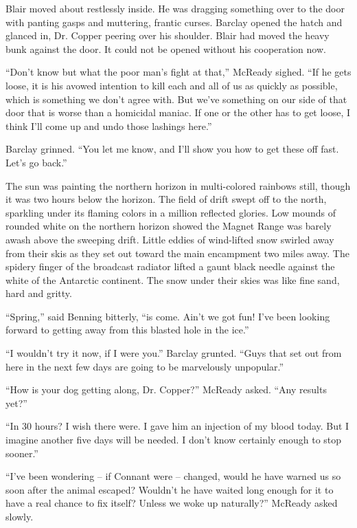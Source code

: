 \documentclass[letterpaper,openany,12pt]{memoir}		%
\begin{document}
Blair moved about restlessly inside. He was dragging something over to the door
with panting gasps and muttering, frantic curses. Barclay opened the hatch and
glanced in, Dr. Copper peering over his shoulder. Blair had moved the heavy bunk
against the door. It could not be opened without his cooperation now.

``Don't know but what the poor man's fight at that,'' McReady sighed. ``If he
gets loose, it is his avowed intention to kill each and all of us as quickly as
possible, which is something we don't agree with. But we've something on our
side of that door that is worse than a homicidal maniac. If one or the other has
to get loose, I think I'll come up and undo those lashings here.''

Barclay grinned. ``You let me know, and I'll show you how to get these off fast.
Let's go back.''

The sun was painting the northern horizon in multi-colored rainbows still,
though it was two hours below the horizon. The field of drift swept off to the
north, sparkling under its flaming colors in a million reflected glories. Low
mounds of rounded white on the northern horizon showed the Magnet Range was
barely awash above the sweeping drift. Little eddies of wind-lifted snow swirled
away from their skis as they set out toward the main encampment two miles away.
The spidery finger of the broadcast radiator lifted a gaunt black needle against
the white of the Antarctic continent. The snow under their skies was like fine
sand, hard and gritty.

``Spring,'' said Benning bitterly, ``is come. Ain't we got fun! I've been
looking forward to getting away from this blasted hole in the ice.''

``I wouldn't try it now, if I were you.'' Barclay grunted. ``Guys that set out
from here in the next few days are going to be marvelously unpopular.''

``How is your dog getting along, Dr. Copper?'' McReady asked. ``Any results
yet?''

``In 30 hours? I wish there were. I gave him an injection of my blood today. But
I imagine another five days will be needed. I don't know certainly enough to
stop sooner.''

``I've been wondering -- if Connant were -- changed, would he have warned us so
soon after the animal escaped? Wouldn't he have waited long enough for it to
have a real chance to fix itself? Unless we woke up naturally?'' McReady asked
slowly.
\end{document}
